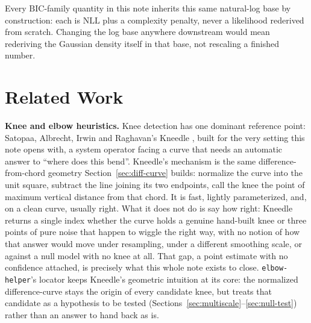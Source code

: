 \documentclass[11pt]{article}
\newcommand{\code}[1]{\texttt{#1}}
\begin{document}
Every $\mathrm{BIC}$-family quantity in this note inherits this same
natural-log base by construction: each is $\mathrm{NLL}$ plus a complexity
penalty, never a likelihood rederived from scratch. Changing the log base
anywhere downstream would mean rederiving the Gaussian density itself in
that base, not rescaling a finished number.

\section{Related Work}
\label{sec:related-work}

\textbf{Knee and elbow heuristics.} Knee detection has one dominant
reference point: Satopaa, Albrecht, Irwin and Raghavan's Kneedle
\citep{satopaa2011}, built for the very setting this note opens
with, a system operator facing a curve that needs an automatic answer
to ``where does this bend''. Kneedle's mechanism is the same
difference-from-chord geometry Section~\ref{sec:diff-curve} builds:
normalize the curve into the unit square, subtract the line joining its
two endpoints, call the knee the point of maximum vertical distance from
that chord. It is fast, lightly parameterized, and, on a clean curve,
usually right. What it does not do is say how right: Kneedle returns a
single index whether the curve holds a genuine hand-built knee or three
points of pure noise that happen to wiggle the right way, with no notion
of how that answer would move under resampling, under a different
smoothing scale, or against a null model with no knee at all. That gap,
a point estimate with no confidence attached, is precisely what this
whole note exists to close. \code{elbow-helper}'s locator keeps
Kneedle's geometric intuition at its core: the normalized
difference-curve stays the origin of every candidate knee, but treats
that candidate as a hypothesis to be tested
(Sections~\ref{sec:multiscale}--\ref{sec:null-test}) rather than an
answer to hand back as is.
\end{document}
